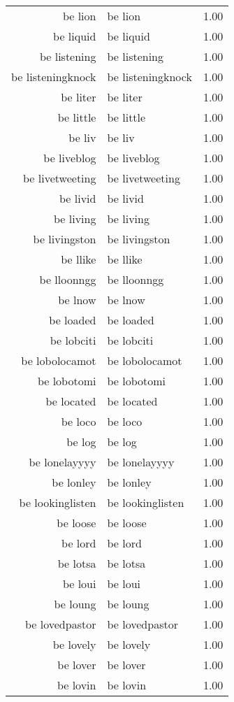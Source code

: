 \begin{table}[ht]
\begin{tabular}{rlr}
  be lion & be lion & 1.00 \\ 
  be liquid & be liquid & 1.00 \\ 
  be listening & be listening & 1.00 \\ 
  be listeningknock & be listeningknock & 1.00 \\ 
  be liter & be liter & 1.00 \\ 
  be little & be little & 1.00 \\ 
  be liv & be liv & 1.00 \\ 
  be liveblog & be liveblog & 1.00 \\ 
  be livetweeting & be livetweeting & 1.00 \\ 
  be livid & be livid & 1.00 \\ 
  be living & be living & 1.00 \\ 
  be livingston & be livingston & 1.00 \\ 
  be llike & be llike & 1.00 \\ 
  be lloonngg & be lloonngg & 1.00 \\ 
  be lnow & be lnow & 1.00 \\ 
  be loaded & be loaded & 1.00 \\ 
  be lobciti & be lobciti & 1.00 \\ 
  be lobolocamot & be lobolocamot & 1.00 \\ 
  be lobotomi & be lobotomi & 1.00 \\ 
  be located & be located & 1.00 \\ 
  be loco & be loco & 1.00 \\ 
  be log & be log & 1.00 \\ 
  be lonelayyyy & be lonelayyyy & 1.00 \\ 
  be lonley & be lonley & 1.00 \\ 
  be lookinglisten & be lookinglisten & 1.00 \\ 
  be loose & be loose & 1.00 \\ 
  be lord & be lord & 1.00 \\ 
  be lotsa & be lotsa & 1.00 \\ 
  be loui & be loui & 1.00 \\ 
  be loung & be loung & 1.00 \\ 
  be lovedpastor & be lovedpastor & 1.00 \\ 
  be lovely & be lovely & 1.00 \\ 
  be lover & be lover & 1.00 \\ 
  be lovin & be lovin & 1.00 \\ 

\end{tabular}
\end{table}
